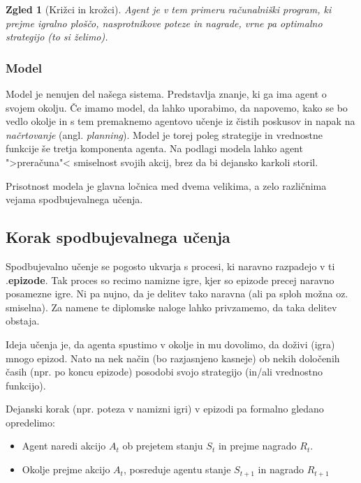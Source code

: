 \documentclass[12pt,a4paper]{amsart}
\theoremstyle{definition} %
\theoremstyle{plain} %
\newtheorem{zgled}[definicija]{Zgled}
\begin{document}
\begin{zgled}[Križci in krožci]
    Agent je v tem primeru računalniški program, ki prejme igralno ploščo, nasprotnikove 
    poteze in nagrade, vrne pa optimalno strategijo (to si želimo).
\end{zgled}

\subsubsection{Model}
Model je nenujen del našega sistema. Predstavlja znanje, ki ga ima agent o svojem okolju. 
Če imamo model, da lahko uporabimo, da napovemo, kako se bo vedlo okolje in s tem premaknemo
agentovo učenje iz čistih poskusov in napak na \textit{načrtovanje} (angl. \textit{planning}).
Model je torej poleg strategije in vrednostne funkcije še tretja komponenta agenta. Na podlagi 
modela lahko agent ">preračuna"< smiselnost svojih akcij, brez da bi dejansko karkoli storil. 

Prisotnost modela je glavna ločnica med dvema velikima, a zelo različnima vejama spodbujevalnega
učenja.

\subsection{Korak spodbujevalnega učenja}
Spodbujevalno učenje se pogosto ukvarja s procesi, ki naravno razpadejo v ti .\textbf{epizode}. 
Tak proces so recimo namizne igre, kjer so epizode precej naravno posamezne igre. Ni pa nujno, 
da je delitev tako naravna (ali pa sploh možna oz. smiselna). Za namene te diplomske naloge lahko 
privzamemo, da taka delitev obstaja.

Ideja učenja je, da agenta spustimo v okolje in mu dovolimo, da doživi (igra) mnogo epizod. Nato 
na nek način (bo razjasnjeno kasneje) ob nekih določenih časih (npr. po koncu epizode) posodobi 
svojo strategijo (in/ali vrednostno funkcijo). 

Dejanski korak (npr. poteza v namizni igri) v epizodi pa formalno gledano opredelimo: 
\begin{itemize}
    \item Agent naredi akcijo $A_t$ ob prejetem stanju $S_t$ in prejme nagrado $R_t$.
    \item Okolje prejme akcijo $A_t$, posreduje agentu stanje $S_{t+1}$ in nagrado $R_{t+1}$
\end{itemize}

\medspace

\end{document}
